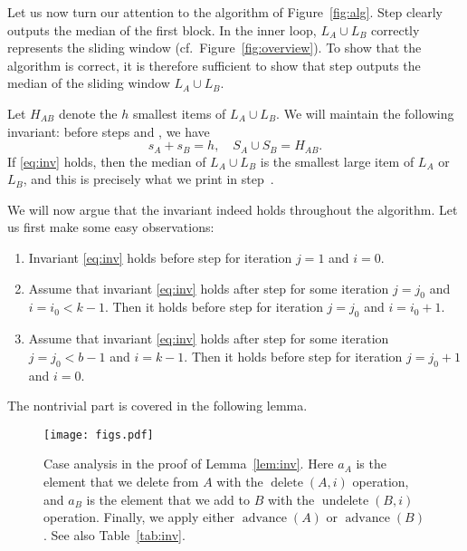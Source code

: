 \documentclass[a4paper,11pt]{article}
\DeclareMathOperator{\Delete}{delete}
\DeclareMathOperator{\Undelete}{undelete}
\DeclareMathOperator{\Advance}{advance}
\begin{document}
Let us now turn our attention to the algorithm of Figure~\ref{fig:alg}. Step \stepa{} clearly outputs the median of the first block. In the inner loop, $L_A \cup L_B$ correctly represents the sliding window (cf.\ Figure~\ref{fig:overview}). To show that the algorithm is correct, it is therefore sufficient to show that step \stepc{} outputs the median of the sliding window $L_A \cup L_B$.

Let $H_{AB}$ denote the $h$ smallest items of $L_A \cup L_B$. We will maintain the following invariant: before steps \stepb{} and \stepc, we have
\begin{equation}\label{eq:inv}
    s_A + s_B = h, \quad
    S_A \cup S_B = H_{AB}.
\end{equation}
If \eqref{eq:inv} holds, then the median of $L_A \cup L_B$ is the smallest large item of $L_A$ or $L_B$, and this is precisely what we print in step~\stepc.

We will now argue that the invariant indeed holds throughout the algorithm. Let us first make some easy observations:
\begin{enumerate}
    \item Invariant \eqref{eq:inv} holds before step \stepb{} for iteration $j=1$ and $i=0$.
    \item Assume that invariant \eqref{eq:inv} holds after step \stepc{} for some iteration $j=j_0$ and $i=i_0 < k-1$. Then it holds before step \stepb{} for iteration $j=j_0$ and $i=i_0+1$.
    \item Assume that invariant \eqref{eq:inv} holds after step \stepc{} for some iteration $j=j_0 < b-1$ and $i=k-1$. Then it holds before step \stepb{} for iteration $j=j_0+1$ and $i=0$.
\end{enumerate}
The nontrivial part is covered in the following lemma.

\begin{figure}[p]
    \centering
    \texttt{[image: figs.pdf]}
    \caption{Case analysis in the proof of Lemma~\ref{lem:inv}. Here $a_A$ is the element that we delete from $A$ with the $\Delete(A,i)$ operation, and $a_B$ is the element that we add to $B$ with the $\Undelete(B,i)$ operation. Finally, we apply either $\Advance(A)$ or $\Advance(B)$. See also Table~\ref{tab:inv}.}\label{fig:inv}
\end{figure}
\end{document}
